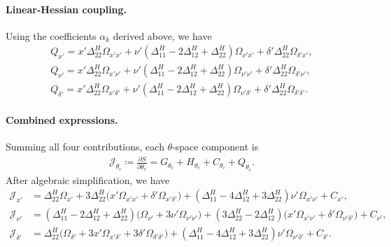 \documentclass{article}
\begin{document}
\paragraph{Linear-Hessian coupling.}

Using the coefficients $\alpha_k$ derived above, we have
%
\begin{align}
  Q_{x'}      = x' \Delta^H_{22} \Omega_{x'x'} + \nu' (\Delta^H_{11} - 2\Delta^H_{12} + \Delta^H_{22}) \Omega_{\nu' x'} + \delta' \Delta^H_{22} \Omega_{\delta' x'},      \\
  Q_{\nu'}    = x' \Delta^H_{22} \Omega_{x'\nu'} + \nu' (\Delta^H_{11} - 2\Delta^H_{12} + \Delta^H_{22}) \Omega_{\nu'\nu'} + \delta' \Delta^H_{22} \Omega_{\delta' \nu'}, \\
  Q_{\delta'} = x' \Delta^H_{22} \Omega_{x'\delta'} + \nu' (\Delta^H_{11} - 2\Delta^H_{12} + \Delta^H_{22}) \Omega_{\nu'\delta'} + \delta' \Delta^H_{22} \Omega_{\delta' \delta'}.
\end{align}

\paragraph{Combined expressions.}

Summing all four contributions, each $\theta$-space component is
%
\begin{align}
  \mathcal{J}_{\theta_c} \coloneqq \frac{\partial S}{\partial \theta_c}
  = G_{\theta_c} + H_{\theta_c} + C_{\theta_c} + Q_{\theta_c}.
\end{align}
%
After algebraic simplification, we have
%
\begin{align}
  \mathcal{J}_{x'}      & = \Delta^H_{22} \Omega_{x'} + 3 \Delta^H_{22} \big( x' \Omega_{x'x'} + \delta' \Omega_{x'\delta'} \big) + (\Delta^H_{11} - 4\Delta^H_{12} + 3\Delta^H_{22}) \nu' \Omega_{x'\nu'} + C_{x'},                                                                                                                          \\
  \mathcal{J}_{\nu'}    & = (\Delta^H_{11} - 2\Delta^H_{12} + \Delta^H_{22}) \big( \Omega_{\nu'} + 3\nu' \Omega_{\nu'\nu'} \big) + (3\Delta^H_{22} - 2\Delta^H_{12}) \big( x' \Omega_{x'\nu'} + \delta' \Omega_{\nu'\delta'} \big) + C_{\nu'},                                                                                                                        \\
  \mathcal{J}_{\delta'} & = \Delta^H_{22} \big( \Omega_{\delta'} + 3 x' \Omega_{x'\delta'} + 3 \delta' \Omega_{\delta'\delta'} \big) + (\Delta^H_{11} - 4\Delta^H_{12} + 3\Delta^H_{22}) \nu' \Omega_{\nu'\delta'} + C_{\delta'}.
\end{align}
\end{document}
